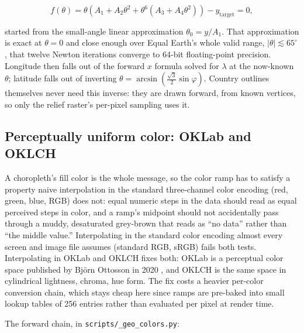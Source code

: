 \documentclass[11pt]{article}
\begin{document}
\[
f(\theta) = \theta\left(A_1 + A_2\theta^2 + \theta^6\left(A_3 + A_4\theta^2\right)\right) - y_{\text{target}} = 0,
\]

started from the small-angle linear approximation $\theta_0 = y / A_1$.
That approximation is exact at $\theta = 0$ and close enough over Equal
Earth's whole valid range, $|\theta| \lesssim 65^\circ$, that twelve
Newton iterations converge to 64-bit floating-point precision. Longitude
then falls out of the forward $x$ formula solved for $\lambda$ at the
now-known $\theta$; latitude falls out of inverting
$\theta = \arcsin\!\left(\tfrac{\sqrt3}{2}\sin\varphi\right)$. Country
outlines themselves never need this inverse: they are drawn forward,
from known vertices, so only the relief raster's per-pixel sampling
uses it.

\subsection{Perceptually uniform color: OKLab and OKLCH}
\label{sec:oklab}

A choropleth's fill color is the whole message, so the color ramp has
to satisfy a property naive interpolation in the standard three-channel
color encoding (red, green, blue, RGB) does not: equal numeric steps in
the data should read as equal perceived steps in color, and a ramp's
midpoint should not accidentally pass through a muddy, desaturated
grey-brown that reads as ``no data'' rather than ``the middle value.''
Interpolating in the standard color encoding almost every screen and
image file assumes (standard RGB, sRGB) fails both tests. Interpolating
in OKLab and OKLCH fixes both: OKLab is a perceptual color space
published by Björn Ottosson in 2020 \autocite{ottosson-oklab}, and OKLCH
is the same space in cylindrical lightness, chroma, hue form. The fix
costs a heavier per-color conversion chain, which stays cheap here since
ramps are pre-baked into small lookup tables of 256 entries rather than
evaluated per pixel at render time.

The forward chain, in \texttt{scripts/\_geo\_colors.py}:
\end{document}

